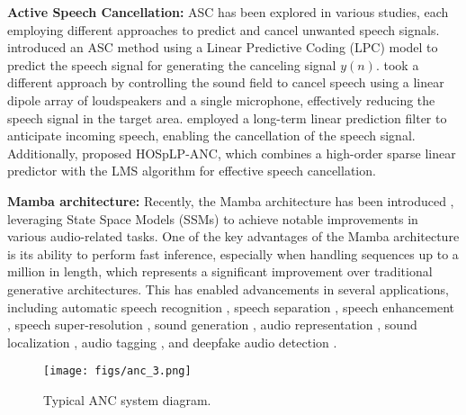 \textbf{Active Speech Cancellation:}
ASC has been explored in various studies, each employing different approaches to predict and cancel unwanted speech signals. \citet{kondo2007speech} introduced an ASC method using a Linear Predictive Coding (LPC) model to predict the speech signal for generating the canceling signal $y(n)$. \citet{donley2017active} took a different approach by controlling the sound field to cancel speech using a linear dipole array of loudspeakers and a single microphone, effectively reducing the speech signal in the target area. \citet{iotov2022computationally} employed a long-term linear prediction filter to anticipate incoming speech, enabling the cancellation of the speech signal. Additionally, \citet{iotov2023adaptive} proposed HOSpLP-ANC, which combines a high-order sparse linear predictor with the LMS algorithm for effective speech cancellation.

\textbf{Mamba architecture:} Recently, the Mamba architecture has been introduced \citep{gu2023mamba, dao2024transformers}, leveraging State Space Models (SSMs) to achieve notable improvements in various audio-related tasks. One of the key advantages of the Mamba architecture is its ability to perform fast inference, especially when handling sequences up to a million in length, which represents a significant improvement over traditional generative architectures. This has enabled advancements in several applications, including automatic speech recognition \citep{zhang2024mamba, zhang2024rethinking}, speech separation \citep{jiang2024dual, li2024spmamba}, speech enhancement \citep{chao2024investigation, luo2024mambagan, quan2024multichannel}, speech super-resolution \citep{waveumamba}, sound generation \citep{jiang2024speech}, audio representation \citep{shams2024ssamba, yadav2024audio, erol2024audio}, sound localization \citep{xiao2024tf, mu2024seld}, audio tagging \citep{lin2024audio}, and deepfake audio detection \citep{chen2024rawbmamba}. 

\begin{figure}[t]
\centering
\begin{minipage}{.45\textwidth}
\centering
\texttt{[image: figs/anc\_3.png]}
\caption{Typical ANC system diagram.}
\label{figs:anc}
\end{minipage}%
\end{figure}